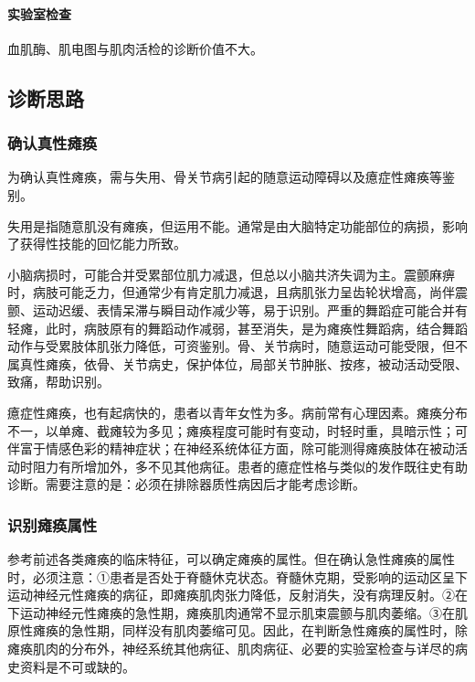 \paragraph{实验室检查}

血肌酶、肌电图与肌肉活检的诊断价值不大。

\subsection{诊断思路}

\subsubsection{确认真性瘫痪}

为确认真性瘫痪，需与失用、骨关节病引起的随意运动障碍以及癔症性瘫痪等鉴别。

失用是指随意肌没有瘫痪，但运用不能。通常是由大脑特定功能部位的病损，影响了获得性技能的回忆能力所致。

小脑病损时，可能合并受累部位肌力减退，但总以小脑共济失调为主。震颤麻痹时，病肢可能乏力，但通常少有肯定肌力减退，且病肌张力呈齿轮状增高，尚伴震颤、运动迟缓、表情呆滞与瞬目动作减少等，易于识别。严重的舞蹈症可能合并有轻瘫，此时，病肢原有的舞蹈动作减弱，甚至消失，是为瘫痪性舞蹈病，结合舞蹈动作与受累肢体肌张力降低，可资鉴别。骨、关节病时，随意运动可能受限，但不属真性瘫痪，依骨、关节病史，保护体位，局部关节肿胀、按疼，被动活动受限、致痛，帮助识别。

癔症性瘫痪，也有起病快的，患者以青年女性为多。病前常有心理因素。瘫痪分布不一，以单瘫、截瘫较为多见；瘫痪程度可能时有变动，时轻时重，具暗示性；可伴富于情感色彩的精神症状；在神经系统体征方面，除可能测得瘫痪肢体在被动活动时阻力有所增加外，多不见其他病征。患者的癔症性格与类似的发作既往史有助诊断。需要注意的是：必须在排除器质性病因后才能考虑诊断。

\subsubsection{识别瘫痪属性}

参考前述各类瘫痪的临床特征，可以确定瘫痪的属性。但在确认急性瘫痪的属性时，必须注意：①患者是否处于脊髓休克状态。脊髓休克期，受影响的运动区呈下运动神经元性瘫痪的病征，即瘫痪肌肉张力降低，反射消失，没有病理反射。②在下运动神经元性瘫痪的急性期，瘫痪肌肉通常不显示肌束震颤与肌肉萎缩。③在肌原性瘫痪的急性期，同样没有肌肉萎缩可见。因此，在判断急性瘫痪的属性时，除瘫痪肌肉的分布外，神经系统其他病征、肌肉病征、必要的实验室检查与详尽的病史资料是不可或缺的。

